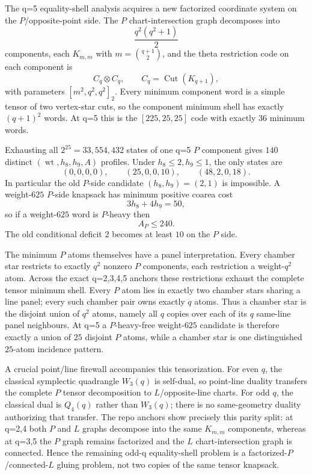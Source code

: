 The q=5 equality-shell analysis acquires a new factorized coordinate system on the $P$/opposite-point side.  The $P$ chart-intersection graph decomposes into
\[
 \frac{q^2(q^2+1)}2
\]
components, each $K_{m,m}$ with $m=\binom{q+1}{2}$, and the theta restriction code on each component is
\[
 C_q\otimes C_q,\qquad C_q=\operatorname{Cut}(K_{q+1}),
\]
with parameters $[m^2,q^2,q^2]_2$.  Every minimum component word is a simple tensor of two vertex-star cuts, so the component minimum shell has exactly $(q+1)^2$ words.  At q=5 this is the $[225,25,25]$ code with exactly $36$ minimum words.

Exhausting all $2^{25}=33{,}554{,}432$ states of one q=5 $P$ component gives $140$ distinct $(\operatorname{wt},h_8,h_9,A)$ profiles.  Under $h_8\le2,h_9\le1$, the only states are
\[
 (0,0,0,0),\qquad (25,0,0,10),\qquad (48,2,0,18).
\]
In particular the old $P$-side candidate $(h_8,h_9)=(2,1)$ is impossible.  A weight-$625$ $P$-side knapsack has minimum positive coarea cost
\[
 3h_8+4h_9=50,
\]
so if a weight-$625$ word is $P$-heavy then
\[
 \boxed{A_P\le240.}
\]
The old conditional deficit $2$ becomes at least $10$ on the $P$ side.

The minimum $P$ atoms themselves have a panel interpretation.  Every chamber star restricts to exactly $q^2$ nonzero $P$ components, each restriction a weight-$q^2$ atom.  Across the exact q=2,3,4,5 anchors these restrictions exhaust the complete tensor minimum shell.  Every $P$ atom lies in exactly two chamber stars sharing a line panel; every such chamber pair owns exactly $q$ atoms.  Thus a chamber star is the disjoint union of $q^2$ atoms, namely all $q$ copies over each of its $q$ same-line panel neighbours.  At q=5 a $P$-heavy-free weight-$625$ candidate is therefore exactly a union of $25$ disjoint $P$ atoms, while a chamber star is one distinguished $25$-atom incidence pattern.

A crucial point/line firewall accompanies this tensorization.  For even $q$, the classical symplectic quadrangle $W_3(q)$ is self-dual, so point-line duality transfers the complete $P$ tensor decomposition to $L$/opposite-line charts.  For odd $q$, the classical dual is $Q_4(q)$ rather than $W_3(q)$; there is no same-geometry duality authorizing that transfer.  The repo anchors show precisely this parity split: at q=2,4 both $P$ and $L$ graphs decompose into the same $K_{m,m}$ components, whereas at q=3,5 the $P$ graph remains factorized and the $L$ chart-intersection graph is connected.  Hence the remaining odd-q equality-shell problem is a factorized-$P$/connected-$L$ gluing problem, not two copies of the same tensor knapsack.


